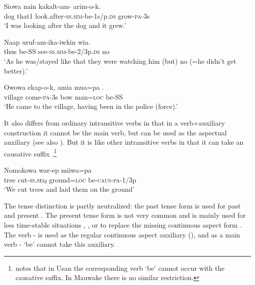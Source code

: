 \ea%
\label{ex:3:x1931}
\gll Siowa nain kakalt-am-\textstyleEmphasizedVernacularWords{-} arim-o-k. \\
dog that1 look.after-\textsc{ss}.\textsc{sim}-be-1s/p.\textsc{ds} grow-\textsc{pa}-3s\\
\glt`I was looking after the dog and it grew.'
\z

\ea%
\label{ex:3:x260}
\gll Naap  uruf-am-ika-iwkin wia. \\
thus be-SS see-\textsc{ss}.\textsc{sim}-be-2/3p.\textsc{ds} no\\
\glt`As he was/stayed like that they were watching him (but) no (=he didn't get better).' 
\z

\ea%
\label{ex:3:x262}
\gll Owowa ekap-o-k, amia mua=pa . \\
village come-\textsc{pa}-3s bow man=\textsc{loc} be-SS \\
\glt`He came to the village, having been in the police (force).'
\z

It also differs from ordinary intransitive verbs in that in a verb+auxiliary construction it cannot be the main verb, but can be used as the aspectual auxiliary  (see also ). But it is like other intransitive verbs in that it can take an causative suffix .\footnote{\citet[142]{Reesink1987} notes that in Usan the corresponding verb  `be' cannot occur with the causative suffix. In Mauwake there is no similar restriction.} 

\ea%
\label{ex:3:x261}
\gll Nomokowa war-ep miiwa=pa  \\
tree cut-\textsc{ss}.\textsc{seq} ground=\textsc{loc} be-\textsc{caus}-\textsc{pa}-1/3p\\
\glt`We cut trees and laid them on the ground' 
\z

The tense distinction is partly neutralized: the past tense form is used for past  and present . The present tense form is not very common and is mainly used for less time-stable situations , , or to replace the missing continuous aspect form . The verb - is used as the regular continuous aspect auxiliary (), and as a main verb - `be' cannot take this auxiliary. 

